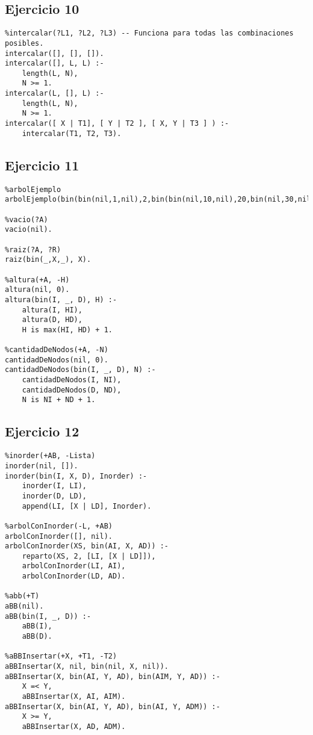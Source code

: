 \documentclass[10pt,a4paper]{article}
\begin{document}
\subsection{Ejercicio 10}
\begin{centrado}
\begin{verbatim}
%intercalar(?L1, ?L2, ?L3) -- Funciona para todas las combinaciones posibles.
intercalar([], [], []).
intercalar([], L, L) :-
	length(L, N),
	N >= 1.
intercalar(L, [], L) :-
	length(L, N),
	N >= 1.
intercalar([ X | T1], [ Y | T2 ], [ X, Y | T3 ] ) :-
	intercalar(T1, T2, T3).
\end{verbatim}
\end{centrado}

\subsection{Ejercicio 11}
\begin{centrado}
\begin{verbatim}
%arbolEjemplo
arbolEjemplo(bin(bin(nil,1,nil),2,bin(bin(nil,10,nil),20,bin(nil,30,nil)))).

%vacio(?A)
vacio(nil).

%raiz(?A, ?R)
raiz(bin(_,X,_), X).

%altura(+A, -H)
altura(nil, 0).
altura(bin(I, _, D), H) :-
	altura(I, HI),
	altura(D, HD),
	H is max(HI, HD) + 1.

%cantidadDeNodos(+A, -N)
cantidadDeNodos(nil, 0).
cantidadDeNodos(bin(I, _, D), N) :-
	cantidadDeNodos(I, NI),
	cantidadDeNodos(D, ND),
	N is NI + ND + 1.
\end{verbatim}
\end{centrado}

\subsection{Ejercicio 12}
\begin{centrado}
\begin{verbatim}
%inorder(+AB, -Lista)
inorder(nil, []).
inorder(bin(I, X, D), Inorder) :-
	inorder(I, LI),
	inorder(D, LD),
	append(LI, [X | LD], Inorder).

%arbolConInorder(-L, +AB)
arbolConInorder([], nil).
arbolConInorder(XS, bin(AI, X, AD)) :-
	reparto(XS, 2, [LI, [X | LD]]),
	arbolConInorder(LI, AI),
	arbolConInorder(LD, AD).

%abb(+T)
aBB(nil).
aBB(bin(I, _, D)) :-
	aBB(I),
	aBB(D).

%aBBInsertar(+X, +T1, -T2)
aBBInsertar(X, nil, bin(nil, X, nil)).
aBBInsertar(X, bin(AI, Y, AD), bin(AIM, Y, AD)) :-
	X =< Y,
	aBBInsertar(X, AI, AIM).
aBBInsertar(X, bin(AI, Y, AD), bin(AI, Y, ADM)) :-
	X >= Y,
	aBBInsertar(X, AD, ADM).
\end{verbatim}
\end{centrado}
\end{document}

